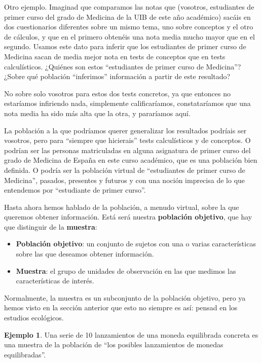 \documentclass[
]{book}
\theoremstyle{definition}
\theoremstyle{definition}
\newtheorem{example}{Ejemplo}[chapter]
\theoremstyle{definition}
\theoremstyle{definition}
\theoremstyle{remark}
\begin{document}
Otro ejemplo. Imaginad que comparamos las notas que (vosotros, estudiantes de primer curso del grado de Medicina de la UIB de este año académico) sacáis en dos cuestionarios diferentes sobre un mismo tema, uno sobre conceptos y el otro de cálculos, y que en el primero obtenéis una nota media mucho mayor que en el segundo. Usamos este dato para inferir que los estudiantes de primer curso de Medicina sacan de media mejor nota en tests de conceptos que en tests calculísticos. ¿Quiénes son estos ``estudiantes de primer curso de Medicina''? ¿Sobre qué población ``inferimos'' información a partir de este resultado?

No sobre solo vosotros para estos dos tests concretos, ya que entonces no estaríamos infiriendo nada, simplemente calificaríamos, constataríamos que una nota media ha sido más alta que la otra, y pararíamos aquí.

La población a la que podríamos querer generalizar los resultados podríais ser vosotros, pero para ``siempre que hicierais'' tests calculísticos y de conceptos. O podrían ser las personas matriculadas en alguna asignatura de primer curso del grado de Medicina de España en este curso académico, que es una población bien definida. O podría ser la población virtual de ``estudiantes de primer curso de Medicina'', pasados, presentes y futuros y con una noción imprecisa de lo que entendemos por ``estudiante de primer curso''.

Hasta ahora hemos hablado de la población, a menudo virtual, sobre la que queremos obtener información. Está será nuestra \textbf{población objetivo}, que hay que distinguir de la \textbf{muestra}:

\begin{itemize}
\item
  \textbf{Población objetivo}: un conjunto de sujetos con una o varias características sobre las que deseamos obtener información.
\item
  \textbf{Muestra}: el grupo de unidades de observación en las que medimos las características de interés.
\end{itemize}

Normalmente, la muestra es un subconjunto de la población objetivo, pero ya hemos visto en la sección anterior que esto no siempre es así: pensad en los estudios ecológicos.

\begin{example}
\protect\hypertarget{exm:unnamed-chunk-57}{}\label{exm:unnamed-chunk-57}Una serie de 10 lanzamientos de una moneda equilibrada concreta es una muestra de la población de ``los posibles lanzamientos de monedas equilibradas''.
\end{example}
\end{document}
